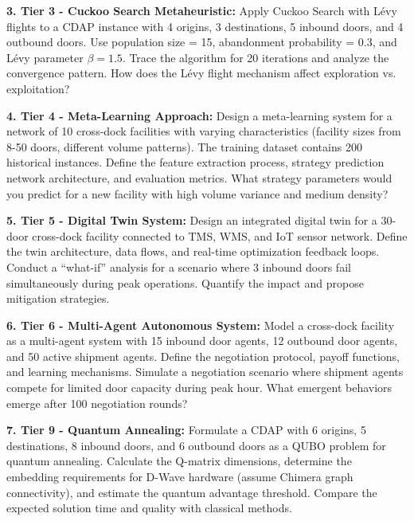 \documentclass{article}
\begin{document}
\textbf{3. Tier 3 - Cuckoo Search Metaheuristic:}
Apply Cuckoo Search with Lévy flights to a CDAP instance with 4 origins, 3 destinations, 5 inbound doors, and 4 outbound doors. Use population size = 15, abandonment probability = 0.3, and Lévy parameter $\beta = 1.5$. Trace the algorithm for 20 iterations and analyze the convergence pattern. How does the Lévy flight mechanism affect exploration vs. exploitation?

\textbf{4. Tier 4 - Meta-Learning Approach:}
Design a meta-learning system for a network of 10 cross-dock facilities with varying characteristics (facility sizes from 8-50 doors, different volume patterns). The training dataset contains 200 historical instances. Define the feature extraction process, strategy prediction network architecture, and evaluation metrics. What strategy parameters would you predict for a new facility with high volume variance and medium density?

\textbf{5. Tier 5 - Digital Twin System:}
Design an integrated digital twin for a 30-door cross-dock facility connected to TMS, WMS, and IoT sensor network. Define the twin architecture, data flows, and real-time optimization feedback loops. Conduct a ``what-if'' analysis for a scenario where 3 inbound doors fail simultaneously during peak operations. Quantify the impact and propose mitigation strategies.

\textbf{6. Tier 6 - Multi-Agent Autonomous System:}
Model a cross-dock facility as a multi-agent system with 15 inbound door agents, 12 outbound door agents, and 50 active shipment agents. Define the negotiation protocol, payoff functions, and learning mechanisms. Simulate a negotiation scenario where shipment agents compete for limited door capacity during peak hour. What emergent behaviors emerge after 100 negotiation rounds?

\textbf{7. Tier 9 - Quantum Annealing:}
Formulate a CDAP with 6 origins, 5 destinations, 8 inbound doors, and 6 outbound doors as a QUBO problem for quantum annealing. Calculate the Q-matrix dimensions, determine the embedding requirements for D-Wave hardware (assume Chimera graph connectivity), and estimate the quantum advantage threshold. Compare the expected solution time and quality with classical methods.
\end{document}
